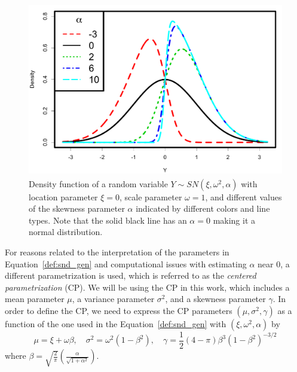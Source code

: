 \documentclass[11pt, oneside]{article}
\begin{document}
\begin{figure}[htbp]
   \centering
\includegraphics[height = 3in]{Skew_normal_densities_jjck.pdf} 
   \caption{Density function of a random variable $Y \sim SN(\xi, \omega^{2}, \alpha)$ with location parameter $\xi = 0$, scale parameter $\omega = 1$, and different values of the skewness parameter $\alpha$ indicated by different colors and line types.
Note that the solid black line has an $\alpha = 0$ making it a normal distribution.   
   }
   \label{fig:SN.plot}
\end{figure}

For reasons related to the interpretation of the parameters in Equation~\eqref{def:snd_gen} and computational issues with estimating $\alpha$ near 0, a different parametrization is used, which is referred to as the \emph{centered parametrization} (CP).  We will be using the CP in this work, which includes a mean parameter $\mu$, a variance parameter $\sigma^2$, and a skewness parameter $\gamma$.  In order to define the CP, we need to express the CP parameters $(\mu, \sigma^2, \gamma)$ as a function of the one used in the Equation~\eqref{def:snd_gen} with $(\xi, \omega^2, \alpha)$ by
%
\begin{equation} \label{eq:snd_cp}
\mu = \xi + \omega \beta, \quad \sigma^{2} = \omega^{2}(1-\beta^2), \quad \gamma = \frac{1}{2}(4-\pi) \beta^{3}\left(1-\beta^2\right)^{-3/2}
\end{equation}
where $\beta = \sqrt{\frac{2}{\pi}}\left(\frac{\alpha}{\sqrt{1+\alpha^2}}\right)$.
\end{document}

